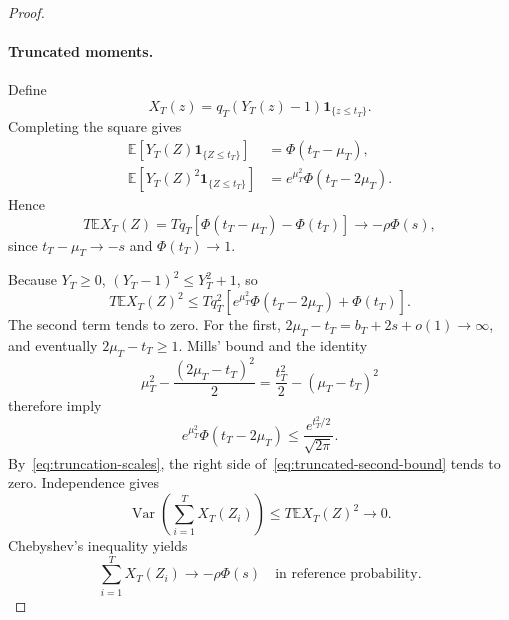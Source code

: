 \documentclass[11pt]{article}
\theoremstyle{remark}
\newcommand{\E}{\mathbb E}
\begin{document}
\begin{proof}
\paragraph{Truncated moments.}
Define
\[
 X_T(z)=q_T(Y_T(z)-1)\mathbf1_{\{z\leq t_T\}}.
\]
Completing the square gives
\begin{align}
 \E[Y_T(Z)\mathbf1_{\{Z\leq t_T\}}]
 &=\Phi(t_T-\mu_T),\label{eq:tilted-first}\\
 \E[Y_T(Z)^2\mathbf1_{\{Z\leq t_T\}}]
 &=e^{\mu_T^2}\Phi(t_T-2\mu_T).\label{eq:tilted-second}
\end{align}
Hence
\[
 T\E X_T(Z)=Tq_T[\Phi(t_T-\mu_T)-\Phi(t_T)]
 \longrightarrow-\rho\Phi(s),
\]
since $t_T-\mu_T\to-s$ and $\Phi(t_T)\to1$.

Because $Y_T\geq0$, $(Y_T-1)^2\leq Y_T^2+1$, so
\begin{equation}\label{eq:truncated-second-bound}
 T\E X_T(Z)^2\leq Tq_T^2
 \left[e^{\mu_T^2}\Phi(t_T-2\mu_T)+\Phi(t_T)\right].
\end{equation}
The second term tends to zero. For the first,
$2\mu_T-t_T=b_T+2s+o(1)\to\infty$, and eventually $2\mu_T-t_T\geq1$.
Mills' bound and the identity
\[
 \mu_T^2-\frac{(2\mu_T-t_T)^2}{2}
 =\frac{t_T^2}{2}-(\mu_T-t_T)^2
\]
therefore imply
\[
 e^{\mu_T^2}\Phi(t_T-2\mu_T)
 \leq\frac{e^{t_T^2/2}}{\sqrt{2\pi}}.
\]
By~\eqref{eq:truncation-scales}, the right side
of~\eqref{eq:truncated-second-bound} tends to zero. Independence gives
\[
 \operatorname{Var}\left(\sum_{i=1}^T X_T(Z_i)\right)
 \leq T\E X_T(Z)^2\longrightarrow0.
\]
Chebyshev's inequality yields
\begin{equation}\label{eq:linear-sum-limit}
 \sum_{i=1}^T X_T(Z_i)\longrightarrow-\rho\Phi(s)
 \quad\text{in reference probability}.
\end{equation}


\end{proof}
\end{document}
